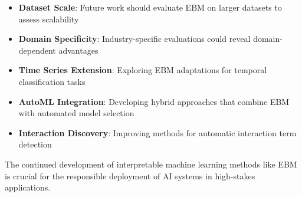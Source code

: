 \documentclass[12pt]{article}
\begin{document}
\begin{itemize}
\item \textbf{Dataset Scale}: Future work should evaluate EBM on larger datasets to assess scalability
\item \textbf{Domain Specificity}: Industry-specific evaluations could reveal domain-dependent advantages
\item \textbf{Time Series Extension}: Exploring EBM adaptations for temporal classification tasks
\item \textbf{AutoML Integration}: Developing hybrid approaches that combine EBM with automated model selection
\item \textbf{Interaction Discovery}: Improving methods for automatic interaction term detection
\end{itemize}

The continued development of interpretable machine learning methods like EBM is crucial for the responsible deployment of AI systems in high-stakes applications.



\end{document}

